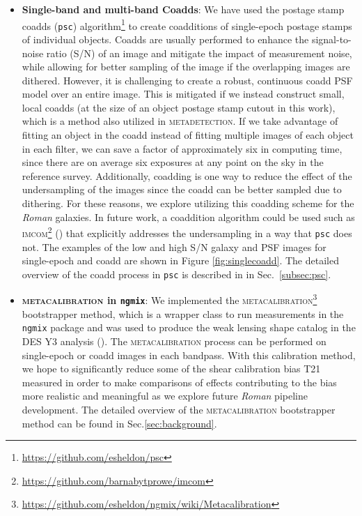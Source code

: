 \documentclass[fleqn,usenatbib]{mnras}
\begin{document}
\begin{itemize}
    \item \textbf{Single-band and multi-band Coadds}: 
    We have used the postage stamp coadds (\texttt{psc}) algorithm\footnote{\url{https://github.com/esheldon/psc}} to create coadditions of single-epoch postage stamps of individual objects. Coadds are usually performed to enhance the signal-to-noise ratio (S/N) of an image and mitigate the impact of measurement noise, while allowing for better sampling of the image if the overlapping images are dithered. However, it is challenging to create a robust, continuous coadd PSF model over an entire image. This is mitigated if we instead construct small, local coadds (at the size of an object postage stamp cutout in this work), which is a method also utilized in \textsc{metadetection}. If we take advantage of fitting an object in the coadd instead of fitting multiple images of each object in each filter, we can save a factor of approximately six in computing time, since there are on average six exposures at any point on the sky in the reference survey. Additionally, coadding is one way to reduce the effect of the undersampling of the images since the coadd can be better sampled due to dithering. For these reasons, we explore utilizing this coadding scheme for the \emph{Roman} galaxies. In future work, a coaddition algorithm could be used such as \textsc{imcom\footnote{\url{https://github.com/barnabytprowe/imcom}} (\citealt{2011ApJ...741...46R})} that explicitly addresses the undersampling in a way that \texttt{psc} does not. The examples of the low and high S/N galaxy and PSF images for single-epoch and coadd are shown in Figure \ref{fig:singlecoadd}. The detailed overview of the coadd process in \texttt{psc} is described in in Sec.~\ref{subsec:psc}.
    
    \item \textbf{\textsc{metacalibration} in \texttt{ngmix}}: We implemented the \textsc{metacalibration}\footnote{\url{https://github.com/esheldon/ngmix/wiki/Metacalibration}} bootstrapper method, which is a wrapper class to run measurements in the \texttt{ngmix} package and was used to produce the weak lensing shape catalog in the DES Y3 analysis (\citealt{2020arXiv201103408G}). The \textsc{metacalibration} process can be performed on single-epoch or coadd images in each bandpass. With this calibration method, we hope to significantly reduce some of the shear calibration bias T21 measured in order to make comparisons of effects contributing to the bias more realistic and meaningful as we explore future \emph{Roman} pipeline development. The detailed overview of the \textsc{metacalibration} bootstrapper method can be found in Sec.\ref{sec:background}. 
\end{itemize}
\end{document}
